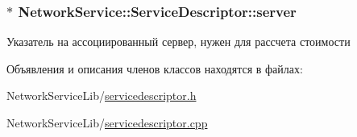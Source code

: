 \subsubsection[{server}]{$\ast$ Network\+Service\+::\+Service\+Descriptor\+::server\hspace{0.3cm}{\ttfamily [private]}}\label{class_network_service_1_1_service_descriptor_ad504b32ced44a75e0e02ea961d9434c4}


Указатель на ассоциированный сервер, нужен для рассчета стоимости 



Объявления и описания членов классов находятся в файлах\+:\begin{DoxyCompactItemize}
\item 
Network\+Service\+Lib/\hyperlink{servicedescriptor_8h}{servicedescriptor.\+h}\item 
Network\+Service\+Lib/\hyperlink{servicedescriptor_8cpp}{servicedescriptor.\+cpp}\end{DoxyCompactItemize}
